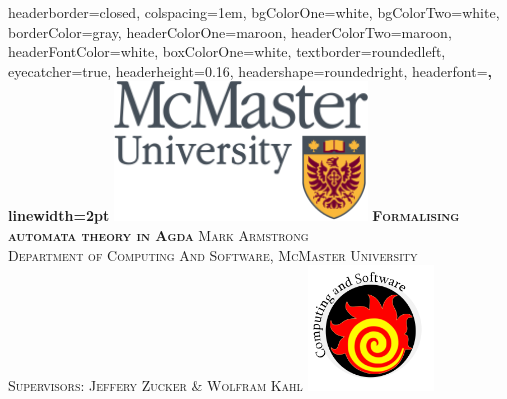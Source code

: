 \documentclass[paperwidth=36in,paperheight=24in,fontscale=0.475]{baposter} %
\begin{document}
\begin{poster}
{
headerborder=closed, %
colspacing=1em, %
bgColorOne=white, %
bgColorTwo=white, %
borderColor=gray, %
headerColorOne=maroon, %
headerColorTwo=maroon, %
headerFontColor=white, %
boxColorOne=white, %
textborder=roundedleft, %
eyecatcher=true, %
headerheight=0.16\textheight, %
headershape=roundedright, %
headerfont=\Large\bf\textsc, %
linewidth=2pt %
}
%
{\includegraphics[height=10em]{mac2.png}} %
{\bf\textsc{Formalising automata theory in Agda}} %
{\textsc{Mark Armstrong \hspace{12pt} \\ Department of Computing And Software, McMaster University
\\ \vspace{4pt} Supervisors: Jeffery Zucker \& Wolfram Kahl  \vspace{-5pt}}} %
{\includegraphics[height=9em]{cas.png}} %




\end{poster}
\end{document}
